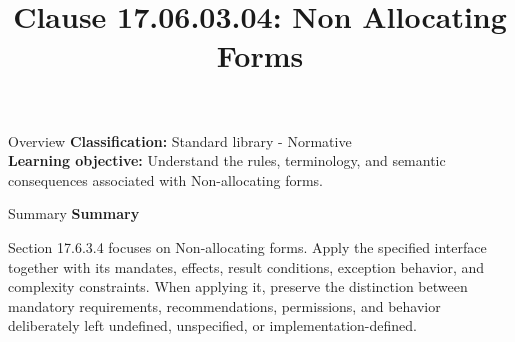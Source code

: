\documentclass[10pt,letterpaper]{article}
\title{Clause 17.06.03.04: Non Allocating Forms}
\author{}
\date{}
\begin{document}
\maketitle
\begin{CornellOverviewBox}{Overview}
\textbf{Classification:} Standard library - Normative\\[2pt]
\textbf{Learning objective:} Understand the rules, terminology, and semantic consequences associated with Non-allocating forms.
\end{CornellOverviewBox}\begin{CornellSummaryBox}{Summary}
{\sffamily\bfseries\color{Accent} Summary}\par\vspace{3pt}Section 17.6.3.4 focuses on Non-allocating forms. Apply the specified interface together with its mandates, effects, result conditions, exception behavior, and complexity constraints. When applying it, preserve the distinction between mandatory requirements, recommendations, permissions, and behavior deliberately left undefined, unspecified, or implementation-defined.
\end{CornellSummaryBox}
\end{document}
